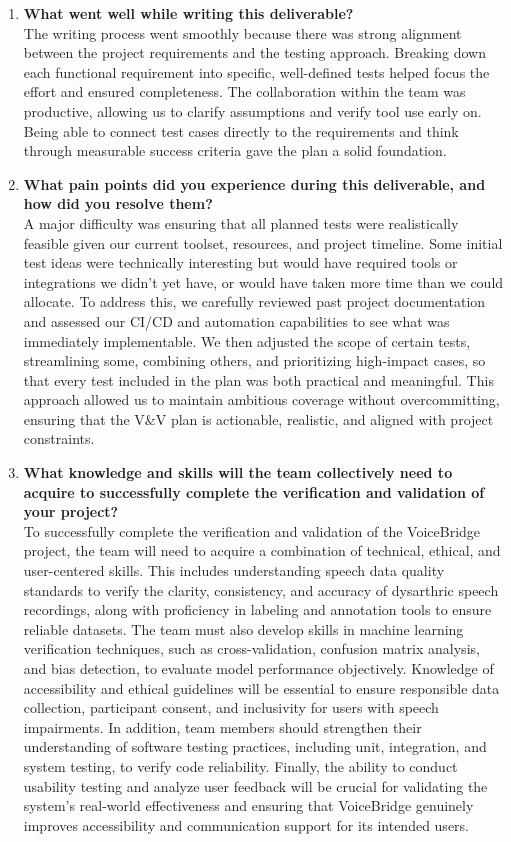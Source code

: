 \begin{enumerate}
  \item \textbf{What went well while writing this deliverable?} \\
  The writing process went smoothly because there was strong alignment between the project requirements and the testing approach.
  Breaking down each functional requirement into specific, well-defined tests helped focus the effort and ensured completeness. The collaboration
  within the team was productive, allowing us to clarify assumptions and verify tool use early on. Being able to connect test cases directly to the
  requirements and think through measurable success criteria gave the plan a solid foundation.

  \item \textbf{What pain points did you experience during this deliverable, and how did you resolve them?} \\
  A major difficulty was ensuring that all planned tests were realistically feasible given our current toolset, resources, and project timeline.
  Some initial test ideas were technically interesting but would have required tools or integrations we didn’t yet have, or would have taken more time than we 
  could allocate. To address this, we carefully reviewed past project documentation and assessed our CI/CD and automation capabilities to see what was
  immediately implementable. We then adjusted the scope of certain tests, streamlining some, combining others, and prioritizing high-impact cases, so that every
  test included in the plan was both practical and meaningful. This approach allowed us to maintain ambitious coverage without overcommitting, ensuring that the V\&V plan is
 actionable, realistic, and aligned with project constraints.

  \item \textbf{What knowledge and skills will the team collectively need to acquire to successfully complete the verification and validation of your project?} \\
  To successfully complete the verification and validation of the VoiceBridge project, the team will need to acquire a combination of technical, ethical, and user-centered skills. 
  This includes understanding speech data quality standards to verify the clarity, consistency, and accuracy of dysarthric speech recordings, along with proficiency in labeling and
   annotation tools to ensure reliable datasets. The team must also develop skills in machine learning verification techniques, such as cross-validation, confusion matrix analysis, and bias detection, to evaluate
   model performance objectively. Knowledge of accessibility and ethical guidelines will be essential to ensure responsible data collection, participant consent, and inclusivity for users with speech impairments.
   In addition, team members should strengthen their understanding of software testing practices, including unit, integration, and system testing, to verify code reliability.
   Finally, the ability to conduct usability testing and analyze user feedback will be crucial for validating the system’s real-world effectiveness and ensuring that VoiceBridge
   genuinely improves accessibility and communication support for its intended users.
\end{enumerate}
